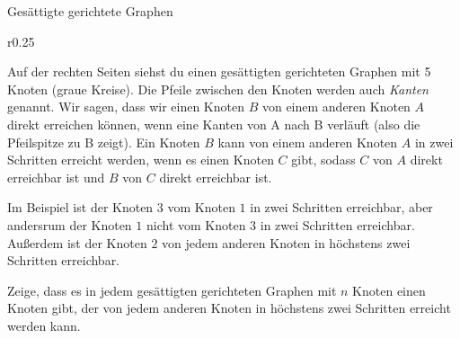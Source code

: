 \documentclass{uebungszettel}
\begin{document}
\begin{aufgabe}{Gesättigte gerichtete Graphen}
  \begin{wrapfigure}{r}{0.25\textwidth}
    \begin{center}
    \end{center}
  \end{wrapfigure}

  Auf der rechten Seiten siehst du einen gesättigten gerichteten Graphen mit 5 Knoten (graue Kreise). Die Pfeile zwischen den Knoten werden auch {\em Kanten} genannt. Wir sagen, dass wir einen Knoten $B$ von einem anderen Knoten $A$ direkt erreichen können, wenn eine Kanten von A nach B verläuft (also die Pfeilspitze zu B zeigt). Ein Knoten $B$ kann von einem anderen Knoten $A$ in zwei Schritten erreicht werden, wenn es einen Knoten $C$ gibt, sodass $C$ von $A$ direkt erreichbar ist und $B$ von $C$ direkt erreichbar ist.

  Im Beispiel ist der Knoten $3$ vom Knoten $1$ in zwei Schritten erreichbar, aber andersrum der Knoten $1$ nicht vom Knoten $3$ in zwei Schritten erreichbar. Außerdem ist der Knoten $2$ von jedem anderen Knoten in höchstens zwei Schritten erreichbar.

  Zeige, dass es in jedem gesättigten gerichteten Graphen mit $n$ Knoten einen Knoten gibt, der von jedem anderen Knoten in höchstens zwei Schritten erreicht werden kann.
\end{aufgabe}
\end{document}
